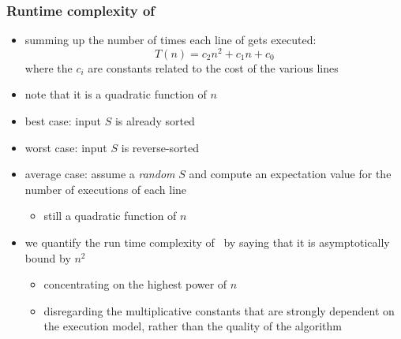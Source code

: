 \begin{frame}[fragile]
%
  \frametitle{Runtime complexity of \insertionsort}
%
  \begin{itemize}
%
  \item summing up the number of times each line of  gets executed:
    \[ T(n) = c_{2} n^{2} + c_{1} n + c_{0} \]
    where the $c_{i}$ are constants related to the cost of the various lines
  \item note that it is a quadratic function of $n$
  \item best case: input $S$ is already sorted
  \item worst case: input $S$ is reverse-sorted
  \item average case: assume a {\em random} $S$ and compute an expectation value for the number
    of executions of each line
    \begin{itemize}
    \item still a quadratic function of $n$
    \end{itemize}
  \item we quantify the run time complexity of \insertionsort\ by saying that it is
    asymptotically bound by $n^2$
    \begin{itemize}
      \item concentrating on the highest power of $n$
      \item disregarding the multiplicative constants that are strongly dependent on the
        execution model, rather than the quality of the algorithm
    \end{itemize}
%
  \end{itemize}
%
\end{frame}

